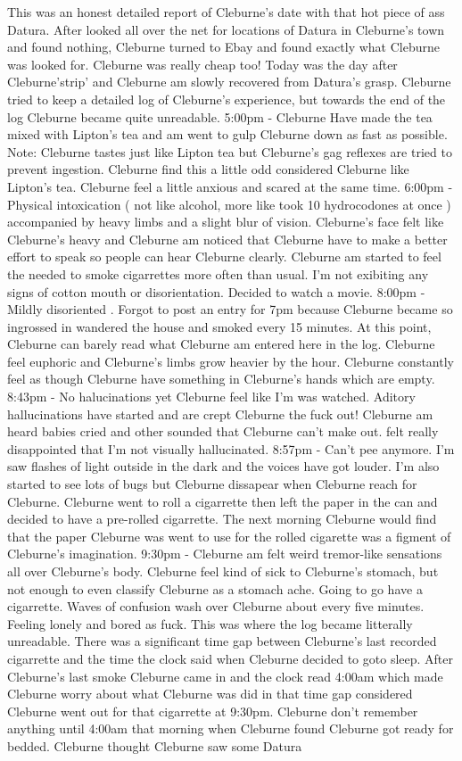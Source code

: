 \documentclass[12pt]{book}
\begin{document}
This was an honest detailed report of Cleburne's date with that hot piece of ass Datura. After looked all over the net for locations of Datura in Cleburne's town and found nothing, Cleburne turned to Ebay and found exactly what Cleburne was looked for. Cleburne was really cheap too! Today was the day after Cleburne'strip' and Cleburne am slowly recovered from Datura's grasp. Cleburne tried to keep a detailed log of Cleburne's experience, but towards the end of the log Cleburne became quite unreadable. 5:00pm - Cleburne Have made the tea mixed with Lipton's tea and am went to gulp Cleburne down as fast as possible. Note: Cleburne tastes just like Lipton tea but Cleburne's gag reflexes are tried to prevent ingestion. Cleburne find this a little odd considered Cleburne like Lipton's tea. Cleburne feel a little anxious and scared at the same time. 6:00pm - Physical intoxication ( not like alcohol, more like took 10 hydrocodones at once ) accompanied by heavy limbs and a slight blur of vision. Cleburne's face felt like Cleburne's heavy and Cleburne am noticed that Cleburne have to make a better effort to speak so people can hear Cleburne clearly. Cleburne am started to feel the needed to smoke cigarrettes more often than usual. I'm not exibiting any signs of cotton mouth or disorientation. Decided to watch a movie. 8:00pm - Mildly disoriented . Forgot to post an entry for 7pm because Cleburne became so ingrossed in wandered the house and smoked every 15 minutes. At this point, Cleburne can barely read what Cleburne am entered here in the log. Cleburne feel euphoric and Cleburne's limbs grow heavier by the hour. Cleburne constantly feel as though Cleburne have something in Cleburne's hands which are empty. 8:43pm - No halucinations yet Cleburne feel like I'm was watched. Aditory hallucinations have started and are crept Cleburne the fuck out! Cleburne am heard babies cried and other sounded that Cleburne can't make out. felt really disappointed that I'm not visually hallucinated. 8:57pm - Can't pee anymore. I'm saw flashes of light outside in the dark and the voices have got louder. I'm also started to see lots of bugs but Cleburne dissapear when Cleburne reach for Cleburne. Cleburne went to roll a cigarrette then left the paper in the can and decided to have a pre-rolled cigarrette. The next morning Cleburne would find that the paper Cleburne was went to use for the rolled cigarette was a figment of Cleburne's imagination. 9:30pm - Cleburne am felt weird tremor-like sensations all over Cleburne's body. Cleburne feel kind of sick to Cleburne's stomach, but not enough to even classify Cleburne as a stomach ache. Going to go have a cigarrette. Waves of confusion wash over Cleburne about every five minutes. Feeling lonely and bored as fuck. This was where the log became litterally unreadable. There was a significant time gap between Cleburne's last recorded cigarrette and the time the clock said when Cleburne decided to goto sleep. After Cleburne's last smoke Cleburne came in and the clock read 4:00am which made Cleburne worry about what Cleburne was did in that time gap considered Cleburne went out for that cigarrette at 9:30pm. Cleburne don't remember anything until 4:00am that morning when Cleburne found Cleburne got ready for bedded. Cleburne thought Cleburne saw some Datura 
\end{document}
